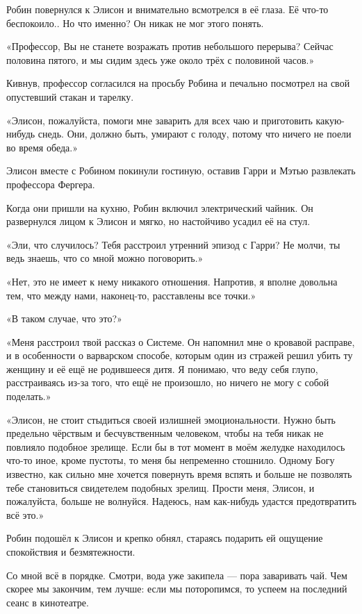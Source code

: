 \documentclass[a5paper, 9pt,
final, openany, twoside=true]{memoir}
\begin{document}
Робин повернулся к Элисон и внимательно всмотрелся в её глаза. Её что-то беспокоило.. Но что именно? Он никак не мог этого понять.

«Профессор, Вы не станете возражать против небольшого перерыва? Сейчас половина пятого, и мы сидим здесь уже около трёх с половиной часов.»

Кивнув, профессор согласился на просьбу Робина и печально посмотрел на свой опустевший стакан и тарелку.

«Элисон, пожалуйста, помоги мне заварить для всех чаю и приготовить какую-нибудь снедь. Они, должно быть, умирают с голоду, потому что ничего не поели во время обеда.»

Элисон вместе с Робином покинули гостиную, оставив Гарри и Мэтью развлекать профессора Фергера.

Когда они пришли на кухню, Робин включил электрический чайник. Он развернулся лицом к Элисон и мягко, но настойчиво усадил её на стул.

«Эли, что случилось? Тебя расстроил утренний эпизод с Гарри? Не молчи, ты ведь знаешь, что со мной можно поговорить.»

«Нет, это не имеет к нему никакого отношения. Напротив, я вполне довольна тем, что между нами, наконец-то, расставлены все точки.»

«В таком случае, что это?»

«Меня расстроил твой рассказ о Системе. Он напомнил мне о кровавой расправе, и в особенности о варварском способе, которым один из стражей решил убить ту женщину и её ещё не родившееся дитя. Я понимаю, что веду себя глупо, расстраиваясь из-за того, что ещё не произошло, но ничего не могу с собой поделать.»

«Элисон, не стоит стыдиться своей излишней эмоциональности. Нужно быть предельно чёрствым и бесчувственным человеком, чтобы на тебя никак не повлияло подобное зрелище. Если бы в тот момент в моём желудке находилось что-то иное, кроме пустоты, то меня бы непременно стошнило. Одному Богу известно, как сильно мне хочется повернуть время вспять и больше не позволять тебе становиться свидетелем подобных зрелищ. Прости меня, Элисон, и пожалуйста, больше не волнуйся. Надеюсь, нам как-нибудь удастся предотвратить всё это.»

Робин подошёл к Элисон и крепко обнял, стараясь подарить ей ощущение спокойствия и безмятежности.

Со мной всё в порядке. Смотри, вода уже закипела — пора заваривать чай. Чем скорее мы закончим, тем лучше: если мы поторопимся, то успеем на последний сеанс в кинотеатре.
\end{document}
